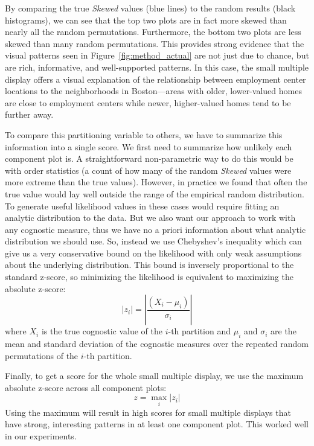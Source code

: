 By comparing the true \emph{Skewed} values (blue lines) to the random results (black histograms), we can see that the top two plots are in fact more skewed than nearly all the random permutations. Furthermore, the bottom two plots are less skewed than many random permutations. This provides strong evidence that the visual patterns seen in Figure~\ref{fig:method_actual} are not just due to chance, but are rich, informative, and well-supported patterns.  In this case, the small multiple display offers a visual explanation of the relationship between employment center locations to the neighborhoods in Boston---areas with older, lower-valued homes are close to employment centers while newer, higher-valued homes tend to be further away.

To compare this partitioning variable to others, we have to summarize this information into a single score. We first need to summarize how unlikely each component plot is. A straightforward non-parametric way to do this would be with order statistics (a count of how many of the random \emph{Skewed} values were more extreme than the true values). However, in practice we found that often the true value would lay well outside the range of the empirical random distribution. To generate useful likelihood values in these cases would require fitting an analytic distribution to the data. But we also want our approach to work with any cognostic measure, thus we have no a priori information about what analytic distribution we should use. So, instead we use Chebyshev's inequality which can give us a very conservative bound on the likelihood with only weak assumptions about the underlying distribution. This bound is inversely proportional to the standard z-score, so minimizing the likelihood is equivalent to maximizing the absolute z-score:
$$|z_i| = \left|\frac{(X_i-\mu_i)}{\sigma_i}\right|$$ 
where $X_i$ is the true cognostic value of the $i$-th partition and $\mu_i$ and $\sigma_i$ are the mean and standard deviation of the cognostic measures over the repeated random permutations of the $i$-th partition.

Finally, to get a score for the whole small multiple display, we use the maximum absolute z-score across all component plots: 
$$z = \max_{i} |z_i|$$
Using the maximum will result in high scores for small multiple displays that have strong, interesting patterns in at least one component plot. This worked well in our experiments.

